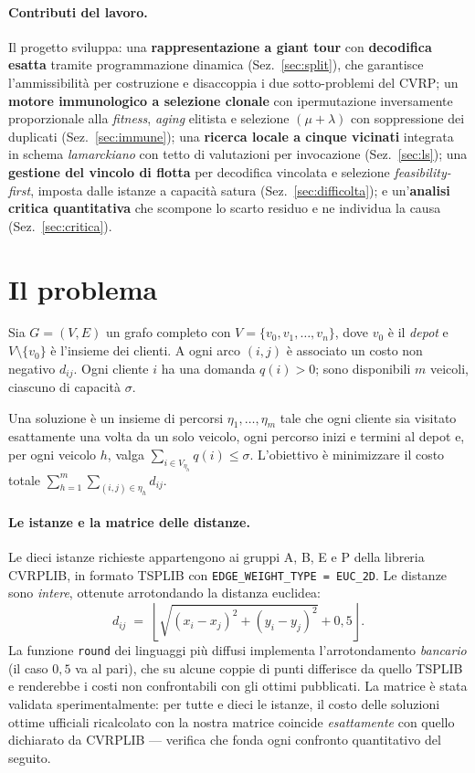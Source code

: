 \documentclass[10pt,a4paper]{article}
\begin{document}
\paragraph{Contributi del lavoro.} Il progetto sviluppa: una
\textbf{rappresentazione a giant tour} con \textbf{decodifica esatta} tramite
programmazione dinamica (Sez.~\ref{sec:split}), che garantisce l'ammissibilità per
costruzione e disaccoppia i due sotto-problemi del CVRP; un \textbf{motore
immunologico a selezione clonale} con ipermutazione inversamente proporzionale
alla \emph{fitness}, \emph{aging} elitista e selezione $(\mu+\lambda)$ con
soppressione dei duplicati (Sez.~\ref{sec:immune}); una \textbf{ricerca locale a
cinque vicinati} integrata in schema \emph{lamarckiano} con tetto di valutazioni
per invocazione (Sez.~\ref{sec:ls}); una \textbf{gestione del vincolo di flotta}
per decodifica vincolata e selezione \emph{feasibility-first}, imposta dalle
istanze a capacità satura (Sez.~\ref{sec:difficolta}); e un'\textbf{analisi critica
quantitativa} che scompone lo scarto residuo e ne individua la causa
(Sez.~\ref{sec:critica}).

\section{Il problema}
\label{sec:problema}

Sia $G=(V,E)$ un grafo completo con $V=\{v_0,v_1,\dots,v_n\}$, dove $v_0$ è il
\emph{depot} e $V\setminus\{v_0\}$ è l'insieme dei clienti. A ogni arco $(i,j)$
è associato un costo non negativo $d_{ij}$. Ogni cliente $i$ ha una domanda
$q(i)>0$; sono disponibili $m$ veicoli, ciascuno di capacità $\sigma$.

Una soluzione è un insieme di percorsi $\eta_1,\dots,\eta_m$ tale che ogni cliente
sia visitato esattamente una volta da un solo veicolo, ogni percorso inizi e
termini al depot e, per ogni veicolo $h$, valga
$\sum_{i \in V_{\eta_h}} q(i) \le \sigma$. L'obiettivo è minimizzare il costo
totale $\sum_{h=1}^{m}\sum_{(i,j)\in\eta_h} d_{ij}$.

\paragraph{Le istanze e la matrice delle distanze.}
Le dieci istanze richieste appartengono ai gruppi A, B, E e P della libreria
CVRPLIB, in formato TSPLIB con \texttt{EDGE\_WEIGHT\_TYPE = EUC\_2D}. Le
distanze sono \emph{intere}, ottenute arrotondando la distanza euclidea:
\[
  d_{ij} \;=\; \left\lfloor \sqrt{(x_i-x_j)^2 + (y_i-y_j)^2} + 0{,}5 \right\rfloor .
\]
La funzione \texttt{round} dei linguaggi più diffusi
implementa l'arrotondamento \emph{bancario} (il caso $0{,}5$ va al pari), che su
alcune coppie di punti differisce da quello TSPLIB e renderebbe i costi non
confrontabili con gli ottimi pubblicati. La matrice è stata validata
sperimentalmente: per tutte e dieci le istanze, il costo delle soluzioni ottime
ufficiali ricalcolato con la nostra matrice coincide \emph{esattamente} con quello
dichiarato da CVRPLIB --- verifica che fonda ogni confronto quantitativo del
seguito.
\end{document}
